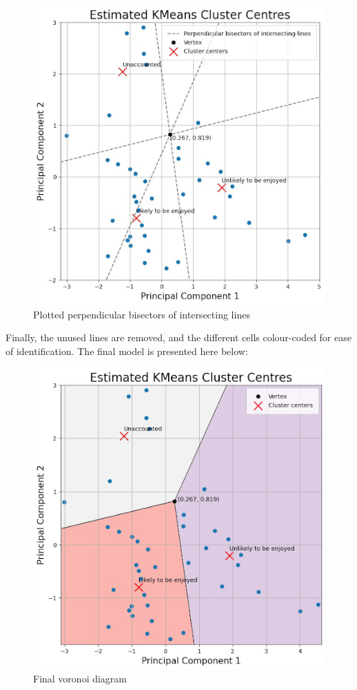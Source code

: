 \documentclass[12pt]{article}
\begin{document}
\begin{figure}[H]
	\includegraphics[scale=0.4]{11}
	\centering
	\caption{Plotted perpendicular bisectors of intersecting lines}
\end{figure}

Finally, the unused lines are removed, and the different cells colour-coded for ease of identification. The final model is presented here below:

\begin{figure}[H]
	\includegraphics[scale=0.4]{12}
	\centering
	\caption{Final voronoi diagram}
\end{figure}
\end{document}
